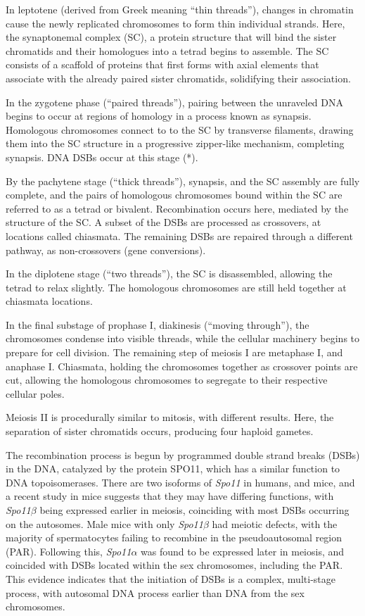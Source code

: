 In leptotene (derived from Greek meaning ``thin threads''), changes in chromatin cause the newly replicated chromosomes to form thin individual strands.
Here, the synaptonemal complex (SC), a protein structure that will bind the sister chromatids and their homologues into a tetrad begins to assemble.
The SC consists of a scaffold of proteins that first forms with axial elements that associate with the already paired sister chromatids, solidifying their association.

In the zygotene phase (``paired threads''), pairing between the unraveled DNA begins to occur at regions of homology in a process known as synapsis.
Homologous chromosomes connect to to the SC by transverse filaments, drawing them into the SC structure in a progressive zipper-like mechanism, completing synapsis\cite{Yang2009}.
DNA DSBs occur at this stage (*).

By the pachytene stage (``thick threads''), synapsis, and the SC assembly are fully complete, and the pairs of homologous chromosomes bound within the SC are referred to as a tetrad or bivalent.
Recombination occurs here, mediated by the structure of the SC.
A subset of the DSBs are processed as crossovers, at locations called chiasmata.
The remaining DSBs are repaired through a different pathway, as non-crossovers (gene conversions).

In the diplotene stage (``two threads''), the SC is disassembled, allowing the tetrad to relax slightly.
The homologous chromosomes are still held together at chiasmata locations.

In the final substage of prophase I, diakinesis (``moving through''), the chromosomes condense into visible threads, while the cellular machinery begins to prepare for cell division.
The remaining step of meiosis I are metaphase I, and anaphase I.
Chiasmata, holding the chromosomes together as crossover points are cut, allowing the homologous chromosomes to segregate to their respective cellular poles.

Meiosis II is procedurally similar to mitosis, with different results.
Here, the separation of sister chromatids occurs, producing four haploid gametes.




The recombination process is begun by programmed double strand breaks (DSBs) in the DNA, catalyzed by the protein SPO11, which has a similar function to DNA topoisomerases\cite{DeMassy2013}.
There are two isoforms of \textit{Spo11} in humans, and mice, and a recent study in mice suggests that they may have differing functions, with \textit{Spo11$\beta$} being expressed earlier in meiosis, coinciding with most DSBs occurring on the autosomes.
Male mice with only \textit{Spo11$\beta$} had meiotic defects, with the majority of spermatocytes failing to recombine in the pseudoautosomal region (PAR).
Following this, \textit{Spo11$\alpha$} was found to be expressed later in meiosis, and coincided with DSBs located within the sex chromosomes, including the PAR\cite{Kauppi2011,DeMassy2013}.
This evidence indicates that the initiation of DSBs is a complex, multi-stage process, with autosomal DNA process earlier than DNA from the sex chromosomes.


